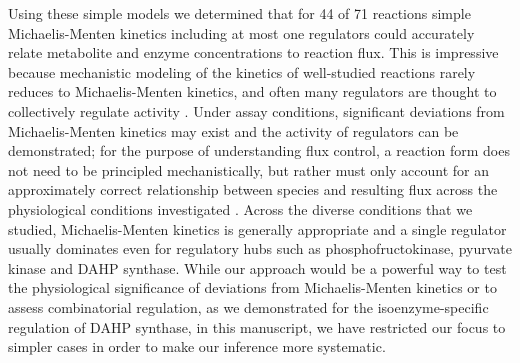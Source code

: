 Using these simple models we determined that for 44 of 71 reactions simple Michaelis-Menten kinetics including at most one regulators could accurately relate metabolite and enzyme concentrations to reaction flux. This is impressive because mechanistic modeling of the kinetics of well-studied reactions rarely reduces to Michaelis-Menten kinetics, and often many regulators are thought to collectively regulate activity \cite{Hill:1977vm}.  Under assay conditions, significant deviations from Michaelis-Menten kinetics may exist and the activity of regulators can be demonstrated; for the purpose of understanding flux control, a reaction form does not need to be principled mechanistically, but rather must only account for an approximately correct relationship between species and resulting flux across the physiological conditions investigated \cite{Fell:1997wg}. Across the diverse conditions that we studied, Michaelis-Menten kinetics is generally appropriate and a single regulator usually dominates even for regulatory hubs such as phosphofructokinase, pyurvate kinase and DAHP synthase.  While our approach would be a powerful way to test the physiological significance of deviations from Michaelis-Menten kinetics or to assess combinatorial regulation, as we demonstrated for the isoenzyme-specific regulation of DAHP synthase, in this manuscript, we have restricted our focus to simpler cases in order to make our inference more systematic.  




